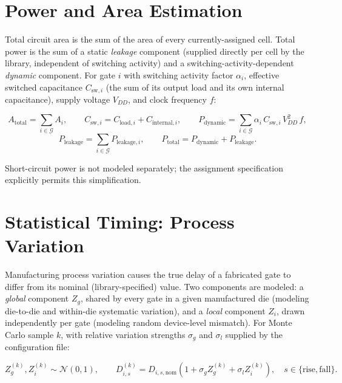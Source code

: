\section{Power and Area Estimation}
\label{sec:bg-power}

Total circuit area is the sum of the area of every currently-assigned cell.
Total power is the sum of a static \emph{leakage} component (supplied
directly per cell by the library, independent of switching activity) and a
switching-activity-dependent \emph{dynamic} component. For gate $i$ with
switching activity factor $\alpha_i$, effective switched capacitance
$C_{\mathrm{sw},i}$ (the sum of its output load and its own internal
capacitance), supply voltage $V_{DD}$, and clock frequency $f$:

\begin{equation}
    A_{\mathrm{total}} = \sum_{i \in \mathcal{G}} A_i, \qquad
    C_{\mathrm{sw},i} = C_{\mathrm{load},i} + C_{\mathrm{internal},i}, \qquad
    P_{\mathrm{dynamic}} = \sum_{i \in \mathcal{G}} \alpha_i\, C_{\mathrm{sw},i}\, V_{DD}^2\, f,
    \label{eq:power-area}
\end{equation}
\begin{equation}
    P_{\mathrm{leakage}} = \sum_{i \in \mathcal{G}} P_{\mathrm{leakage},i}, \qquad
    P_{\mathrm{total}} = P_{\mathrm{dynamic}} + P_{\mathrm{leakage}}.
    \label{eq:power-total}
\end{equation}

Short-circuit power is not modeled separately; the assignment specification
explicitly permits this simplification.

\section{Statistical Timing: Process Variation}
\label{sec:bg-mc}

Manufacturing process variation causes the true delay of a fabricated gate
to differ from its nominal (library-specified) value. Two components are
modeled: a \emph{global} component $Z_g$, shared by every gate in a given
manufactured die (modeling die-to-die and within-die systematic variation),
and a \emph{local} component $Z_i$, drawn independently per gate (modeling
random device-level mismatch). For Monte Carlo sample $k$, with relative
variation strengths $\sigma_g$ and $\sigma_l$ supplied by the configuration
file:

\begin{equation}
    Z_g^{(k)}, Z_i^{(k)} \sim \mathcal{N}(0,1), \qquad
    D_{i,s}^{(k)} = D_{i,s,\mathrm{nom}}\left(1 + \sigma_g Z_g^{(k)} + \sigma_l Z_i^{(k)}\right), \quad s \in \{\mathrm{rise},\mathrm{fall}\}.
    \label{eq:mc-delay}
\end{equation}

